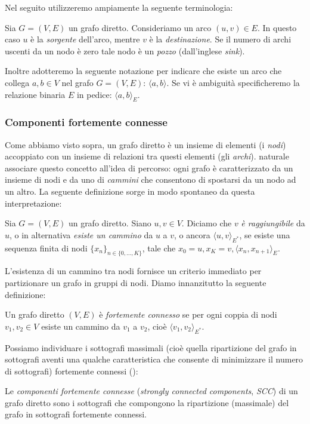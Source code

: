 Nel seguito utilizzeremo ampiamente la seguente terminologia:
\begin{definition}
    Sia $G = (V,E)$ un grafo diretto. Consideriamo un arco $(u,v) \in E$. In questo caso $u$ è la \emph{sorgente} dell'arco, mentre $v$ è la \emph{destinazione}. Se il numero di archi uscenti da un nodo è zero tale nodo  è un \emph{pozzo} (dall'inglese \emph{sink}).
\end{definition}

Inoltre adotteremo la seguente notazione per indicare che esiste un arco che collega $a,b \in V$ nel grafo $G = (V,E)$: $\langle a, b \rangle$. Se vi è ambiguità specificheremo la relazione binaria $E$ in pedice: $\langle a, b \rangle_E$.

\subsubsection{Componenti fortemente connesse}
Come abbiamo visto sopra, un grafo diretto è un insieme di elementi (i \emph{nodi}) accoppiato con un insieme di relazioni tra questi elementi (gli \emph{archi}). \accente naturale associare questo concetto all'idea di percorso: ogni grafo è caratterizzato da un insieme di nodi e da uno di \emph{cammini} che consentono di spostarsi da un nodo ad un altro. La seguente definizione sorge in modo spontaneo da questa interpretazione:
\begin{definition}
    Sia $G = (V, E)$ un grafo diretto. Siano $u,v \in V$. Diciamo che $v$ \emph{è raggiungibile} da $u$, o in alternativa \emph{esiste un cammino} da $u$ a $v$, o ancora $\langle u, v \rangle_{E^*}$, se esiste una sequenza finita di nodi $\displaystyle \{x_n\}_{n \in \{0,\dots,K\}}$, tale che $x_0 = u, x_K = v, \langle x_n, x_{n+1} \rangle_E$.
\end{definition}

L'esistenza di un cammino tra nodi fornisce un criterio immediato per partizionare un grafo in gruppi di nodi. Diamo innanzitutto la seguente definizione:
\begin{definition}
    Un grafo diretto $(V,E)$ è \emph{fortemente connesso} se per ogni coppia di nodi $v_1, v_2 \in V$ esiste un cammino da $v_1$ a $v_2$, cioè $\langle v_1, v_2 \rangle_{E^*}$.
\end{definition}

Possiamo individuare i sottografi massimali (cioè quella ripartizione del grafo in sottografi aventi una qualche caratteristica che consente di minimizzare il numero di sottografi) fortemente connessi (\hspace*{-0.1cm}\cite[Appendice B]{clrs}):
\begin{definition}
    Le \emph{componenti fortemente connesse} (\emph{strongly connected components}, \emph{SCC}) di un grafo diretto sono i sottografi che compongono la ripartizione (massimale) del grafo in sottografi fortemente connessi.
\end{definition}


